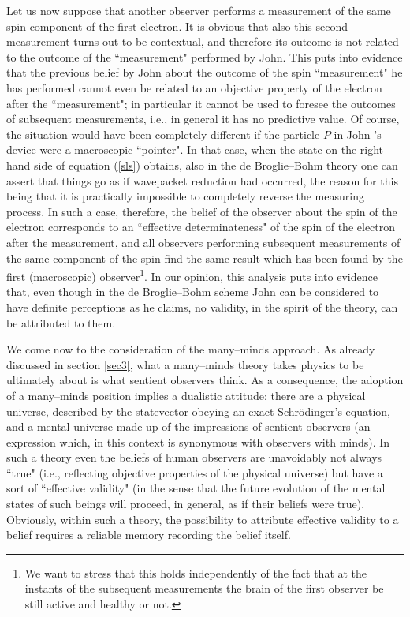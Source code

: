 \documentclass[10pt,a4paper]{article}
\begin{document}
Let us now suppose that another observer performs a measurement of
the same spin component of the first electron. It is obvious that
also this second measurement turns out to be contextual, and
therefore its outcome is not related to the outcome of the
``measurement" performed by John. This puts into evidence that the
previous belief by John about the outcome of the spin
``measurement" he has performed cannot even be related to an
objective property of the electron after the ``measurement"; in
particular it cannot be used to foresee the outcomes of subsequent
measurements, i.e., in general it has no predictive value. Of course, the
situation would have been completely different if the particle $P$
in John 's device were a macroscopic ``pointer". In that case,
when the state on the right hand side of equation (\ref{sls})
obtains, also in the de Broglie--Bohm theory one can assert that
things go as if wavepacket reduction had occurred, the reason for
this being that it is practically impossible to completely reverse
the measuring process. In such a case, therefore, the belief of
the observer about the spin of the electron corresponds to an
``effective determinateness" of the spin of the electron after the
measurement, and all observers performing subsequent measurements
of the same component of the spin find the same result which has
been found by the first (macroscopic) observer\footnote{We want to
stress that this holds independently of the fact that at the
instants of the subsequent measurements the brain of the first
observer be still active and healthy or not.}. In our opinion,
this analysis puts into evidence that, even though in the de
Broglie--Bohm scheme John can be considered to have definite
perceptions as he claims, no validity, in the spirit of the
theory, can be attributed to them.

We come now to the consideration of the many--minds approach. As
already discussed in section \ref{sec3}, what a many--minds theory
takes physics to be ultimately about is what sentient observers
think. As a consequence, the adoption of a many--minds position
implies a dualistic attitude: there are a physical universe,
described by the statevector obeying an exact Schr\"odinger's
equation, and a mental universe made up of the impressions of
sentient observers (an expression which, in this context is
synonymous with observers with minds). In such a theory even the
beliefs of human observers are unavoidably not always ``true"
(i.e., reflecting objective properties of the physical universe)
but have a sort of ``effective validity" (in the sense that the
future evolution of the mental states of such beings will proceed,
in general, as if their beliefs were true). Obviously, within such
a theory, the possibility to attribute effective validity to a
belief requires a reliable memory recording the belief itself.
\end{document}
